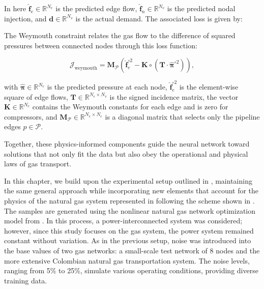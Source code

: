 \noindent In here \( \hat{\mathbf{f}}_e \in \mathbb{R}^{N_e} \) is the predicted edge flow, \( \hat{\mathbf{f}}_n \in \mathbb{R}^{N_v} \) is the predicted nodal injection, and \( \mathbf{d} \in \mathbb{R}^{N_v} \) is the actual demand. The associated loss is given by:


The Weymouth constraint relates the gas flow to the difference of squared pressures between connected nodes through this loss function:

\begin{equation} \label{eq:Weymouth_GNN}
\mathcal{J}_{\text{weymouth}} =  \mathbf{M}_{\mathcal{P}} \left( \hat{\mathbf{f}}_e^{\circ 2} - \mathbf{K} \circ \left( \mathbf{T} \cdot \hat{\boldsymbol{\pi}}^{\circ 2} \right) \right),
\end{equation}


\noindent with \( \hat{\boldsymbol{\pi}} \in \mathbb{R}^{N_v} \) is the predicted pressure at each node, \( \hat{\mathbf{f}}_e^{\circ 2} \) is the element-wise square of edge flows, \( \mathbf{T} \in \mathbb{R}^{N_e \times N_v} \) is the signed incidence matrix, the vector \( \mathbf{K} \in \mathbb{R}^{N_e} \) contains the Weymouth constants for each edge and is zero for compressors, and \( \mathbf{M}_{\mathcal{P}} \in \mathbb{R}^{N_e \times N_e} \) is a diagonal matrix that selects only the pipeline edges \( p \in \mathcal{P} \).

Together, these physics-informed components guide the neural network toward solutions that not only fit the data but also obey the operational and physical laws of gas transport.


In this chapter, we build upon the experimental setup outlined in , maintaining the same general approach while incorporating new elements that account for the physics of the natural gas system represented in  following the scheme shown in . The samples are generated using the nonlinear natural gas network optimization model from . In this process, a power-interconnected system was considered; however, since this study focuses on the gas system, the power system remained constant without variation. As in the previous setup, noise was introduced into the base values of two gas networks: a small-scale test network of 8 nodes and the more extensive Colombian natural gas transportation system. The noise levels, ranging from 5\% to 25\%, simulate various operating conditions, providing diverse training data.


